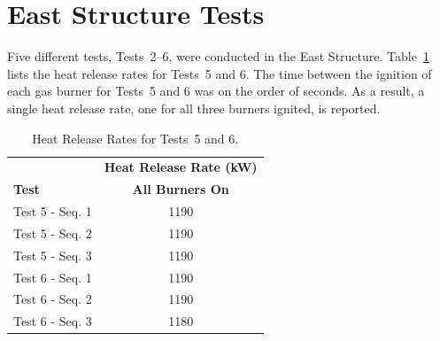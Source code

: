 \section{East Structure Tests}
Five different tests, Tests~2--6, were conducted in the East Structure. Table~\ref{table:HRR_Tests_5-6} lists the heat release rates for Tests~5 and 6. The time between the ignition of each gas burner for Tests~5 and 6 was on the order of seconds. As a result, a single heat release rate, one for all three burners ignited, is reported.

\renewcommand{\baselinestretch}{1}

\begin{table}[!ht]
\caption[Heat Release Rates for Tests~5 and 6.]{Heat Release Rates for Tests~5 and 6.}
\begin{center}
\begin{tabular}{lc}
 \toprule
 & \textbf{Heat Release Rate (kW)} \\
\textbf{Test} & \textbf{All Burners On} \\
\midrule
Test 5 - Seq. 1		& 1190 \\
Test 5 - Seq. 2		& 1190 \\
Test 5 - Seq. 3		& 1190 \\
Test 6 - Seq. 1		& 1190 \\
Test 6 - Seq. 2		& 1190 \\
Test 6 - Seq. 3		& 1180 \\
\bottomrule
\end{tabular}
\end{center}
\label{table:HRR_Tests_5-6}
\end{table}
\FloatBarrier

